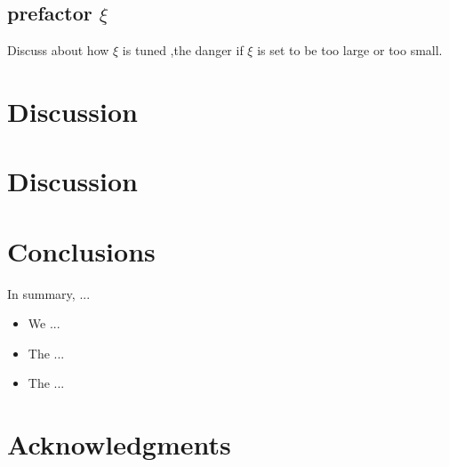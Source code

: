 \documentclass[useAMS,usenatbib]{mn2e}
\begin{document}
\subsection{prefactor $\xi$}
Discuss about how $\xi$ is tuned ,the danger if $\xi$ is set to be too large or too small. 






\section{Discussion}
\label{sec:XXX}



\section{Discussion}
\label{sec:discuss}



\section{Conclusions}
\label{sec:conclusions}

In summary, ...

\begin{itemize}

\item We ...

\item The ...

\item The ...

\end{itemize}




\section*{Acknowledgments}
 
\end{document}
